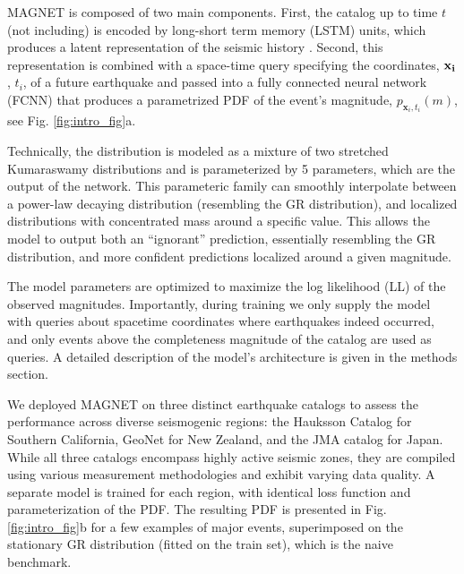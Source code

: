 \documentclass[pdflatex]{sn-jnl}
\begin{document}
MAGNET is composed of two main components. First, the catalog up to time $t$ (not including) is encoded by long-short term memory (LSTM) units, which produces a latent representation of the seismic history \cite{hochreiter_long_1997}.
Second, this representation is combined with a space-time query specifying the coordinates, $\bf{x}_i$, $t_i$, of a future earthquake and passed into a fully connected neural network (FCNN) that produces a parametrized PDF of the event's magnitude, $p_{\textbf{x}_i, t_i}(m)$, see Fig. \ref{fig:intro_fig}a. 

Technically, the distribution is modeled as a mixture of two stretched Kumaraswamy distributions \cite{kumaraswamy_generalized_1980} and is parameterized by 5 parameters, which are the output of the network. This parameteric family can  smoothly interpolate between a power-law decaying distribution (resembling the GR distribution), and localized distributions with concentrated mass around a specific value. This allows the model to output both an ``ignorant'' prediction, essentially resembling the GR distribution, and more confident predictions localized around a given magnitude.

The model parameters are optimized to maximize the log likelihood (LL) of the observed magnitudes. Importantly, during training we only supply the model with queries about spacetime coordinates where earthquakes indeed occurred, and only events above the completeness magnitude of the catalog are used as queries. A detailed description of the model's architecture is given in the methods section.


We deployed MAGNET on three distinct earthquake catalogs to assess the performance across diverse seismogenic regions: the Hauksson Catalog \cite{hauksson_waveform_2012} for Southern California, GeoNet \cite{gns_geonet_1970} for New Zealand, and the JMA catalog \cite{noauthor_japan_nodate} for Japan. While all three catalogs encompass highly active seismic zones, they are compiled using various measurement methodologies and exhibit varying data quality. A separate model is trained for each region, with identical loss function and parameterization of the PDF. The resulting PDF is presented in Fig. \ref{fig:intro_fig}b for a few examples of major events, superimposed on the stationary GR distribution (fitted on the train set), which is the naive benchmark.
\end{document}
